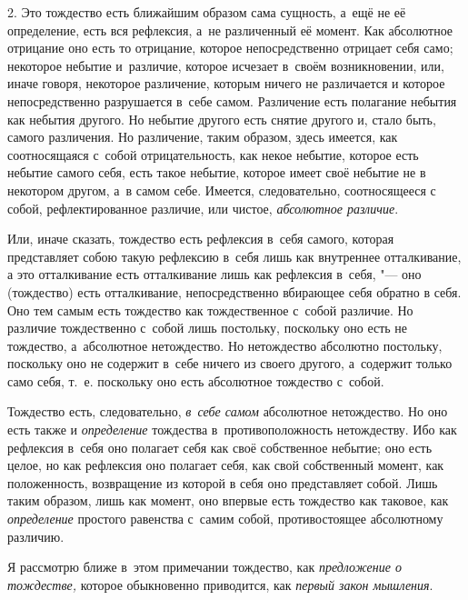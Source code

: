 2. Это тождество есть ближайшим образом сама сущность, а~ещё не её
определение, есть вся рефлексия, а~не различенный её момент. Как абсолютное
отрицание оно есть то отрицание, которое непосредственно отрицает себя
само; некоторое небытие и~различие, которое исчезает в~своём возникновении,
или, иначе говоря, некоторое различение, которым ничего не различается и
которое непосредственно разрушается в~себе самом. Различение есть полагание
небытия как небытия другого. Но небытие другого есть снятие другого и,
стало быть, самого различения. Но различение, таким образом, здесь имеется,
как соотносящаяся с~собой отрицательность, как некое небытие, которое есть
небытие самого себя, есть такое небытие, которое имеет своё небытие не в
некотором другом, а~в самом себе. Имеется, следовательно, соотносящееся с
собой, рефлектированное различие, или чистое,
{\em абсолютное различие}.

Или, иначе сказать, тождество есть рефлексия в~себя самого, которая
представляет собою такую рефлексию в~себя лишь как внутреннее отталкивание,
а это отталкивание есть отталкивание лишь как рефлексия в~себя, "--- оно
(тождество) есть отталкивание, непосредственно вбирающее себя обратно в
себя. Оно тем самым есть тождество как тождественное с~собой различие. Но
различие тождественно с~собой лишь постольку, поскольку оно есть не
тождество, а~абсолютное нетождество. Но нетождество абсолютно постольку,
поскольку оно не содержит в~себе ничего из своего другого, а~содержит
только само себя, т.~е. поскольку оно есть абсолютное тождество с~собой.

Тождество есть, следовательно, {\em в~себе самом}
абсолютное нетождество. Но оно есть также и
{\em определение} тождества в~противоположность
нетождеству. Ибо как рефлексия в~себя оно полагает себя как своё
собственное небытие; оно есть целое, но как рефлексия оно полагает себя,
как свой собственный момент, как положенность, возвращение из которой в
себя оно представляет собой. Лишь таким образом, лишь как момент, оно
впервые есть тождество как таковое, как
{\em определение} простого равенства с~самим собой,
противостоящее абсолютному различию.


Я рассмотрю ближе в~этом примечании тождество, как {\em предложение о
тождестве,} которое обыкновенно приводится, как {\em первый закон мышления}.

